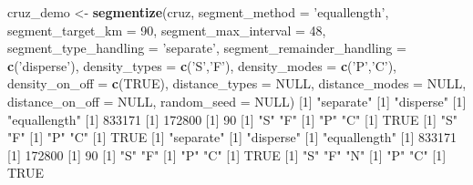 \documentclass[
]{book}
\newenvironment{Shaded}{\begin{snugshade}}{\end{snugshade}}
\newcommand{\DataTypeTok}[1]{\textcolor[rgb]{0.13,0.29,0.53}{#1}}
\newcommand{\DecValTok}[1]{\textcolor[rgb]{0.00,0.00,0.81}{#1}}
\newcommand{\KeywordTok}[1]{\textcolor[rgb]{0.13,0.29,0.53}{\textbf{#1}}}
\newcommand{\NormalTok}[1]{#1}
\newcommand{\OtherTok}[1]{\textcolor[rgb]{0.56,0.35,0.01}{#1}}
\newcommand{\StringTok}[1]{\textcolor[rgb]{0.31,0.60,0.02}{#1}}
\begin{document}
\begin{Shaded}
\begin{Highlighting}[]
\NormalTok{cruz_demo <-}\StringTok{ }\KeywordTok{segmentize}\NormalTok{(cruz,}
                        \DataTypeTok{segment_method =} \StringTok{'equallength'}\NormalTok{,}
                        \DataTypeTok{segment_target_km =} \DecValTok{90}\NormalTok{,}
                        \DataTypeTok{segment_max_interval =} \DecValTok{48}\NormalTok{,}
                        \DataTypeTok{segment_type_handling =} \StringTok{'separate'}\NormalTok{,}
                        \DataTypeTok{segment_remainder_handling =} \KeywordTok{c}\NormalTok{(}\StringTok{'disperse'}\NormalTok{),}
                        \DataTypeTok{density_types =} \KeywordTok{c}\NormalTok{(}\StringTok{'S'}\NormalTok{,}\StringTok{'F'}\NormalTok{),}
                        \DataTypeTok{density_modes =} \KeywordTok{c}\NormalTok{(}\StringTok{'P'}\NormalTok{,}\StringTok{'C'}\NormalTok{),}
                        \DataTypeTok{density_on_off =} \KeywordTok{c}\NormalTok{(}\OtherTok{TRUE}\NormalTok{),}
                        \DataTypeTok{distance_types =} \OtherTok{NULL}\NormalTok{,}
                        \DataTypeTok{distance_modes =} \OtherTok{NULL}\NormalTok{,}
                        \DataTypeTok{distance_on_off =} \OtherTok{NULL}\NormalTok{,}
                        \DataTypeTok{random_seed =} \OtherTok{NULL}\NormalTok{)}
\NormalTok{[}\DecValTok{1}\NormalTok{] }\StringTok{"separate"}
\NormalTok{[}\DecValTok{1}\NormalTok{] }\StringTok{"disperse"}
\NormalTok{[}\DecValTok{1}\NormalTok{] }\StringTok{"equallength"}
\NormalTok{[}\DecValTok{1}\NormalTok{] }\DecValTok{833171}
\NormalTok{[}\DecValTok{1}\NormalTok{] }\DecValTok{172800}
\NormalTok{[}\DecValTok{1}\NormalTok{] }\DecValTok{90}
\NormalTok{[}\DecValTok{1}\NormalTok{] }\StringTok{"S"} \StringTok{"F"}
\NormalTok{[}\DecValTok{1}\NormalTok{] }\StringTok{"P"} \StringTok{"C"}
\NormalTok{[}\DecValTok{1}\NormalTok{] }\OtherTok{TRUE}
\NormalTok{[}\DecValTok{1}\NormalTok{] }\StringTok{"S"} \StringTok{"F"}
\NormalTok{[}\DecValTok{1}\NormalTok{] }\StringTok{"P"} \StringTok{"C"}
\NormalTok{[}\DecValTok{1}\NormalTok{] }\OtherTok{TRUE}
\NormalTok{[}\DecValTok{1}\NormalTok{] }\StringTok{"separate"}
\NormalTok{[}\DecValTok{1}\NormalTok{] }\StringTok{"disperse"}
\NormalTok{[}\DecValTok{1}\NormalTok{] }\StringTok{"equallength"}
\NormalTok{[}\DecValTok{1}\NormalTok{] }\DecValTok{833171}
\NormalTok{[}\DecValTok{1}\NormalTok{] }\DecValTok{172800}
\NormalTok{[}\DecValTok{1}\NormalTok{] }\DecValTok{90}
\NormalTok{[}\DecValTok{1}\NormalTok{] }\StringTok{"S"} \StringTok{"F"}
\NormalTok{[}\DecValTok{1}\NormalTok{] }\StringTok{"P"} \StringTok{"C"}
\NormalTok{[}\DecValTok{1}\NormalTok{] }\OtherTok{TRUE}
\NormalTok{[}\DecValTok{1}\NormalTok{] }\StringTok{"S"} \StringTok{"F"} \StringTok{"N"}
\NormalTok{[}\DecValTok{1}\NormalTok{] }\StringTok{"P"} \StringTok{"C"}
\NormalTok{[}\DecValTok{1}\NormalTok{] }\OtherTok{TRUE}


\end{Highlighting}
\end{Shaded}
\end{document}

